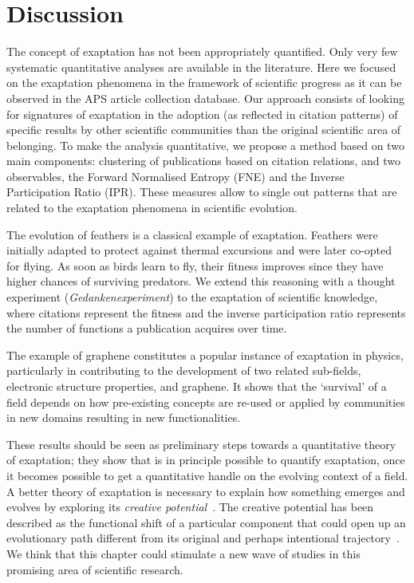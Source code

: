 \documentclass[draft,final]{vutinfth} %
\begin{document}
\section{Discussion}
The concept of exaptation has not been appropriately quantified. 
Only very few systematic quantitative analyses are available in the literature. 
Here we focused on the exaptation phenomena in the framework of scientific progress as it can be observed in the APS article collection database. 
Our approach consists of looking for signatures of exaptation in the adoption (as reflected in citation patterns) of specific results by other scientific communities than the original scientific area of belonging. 
To make the analysis quantitative, we propose a method based on two main components: clustering of publications based on citation relations, and two observables, the Forward Normalised Entropy (FNE) and the Inverse Participation Ratio (IPR). 
These measures allow to single out patterns that are related to the exaptation phenomena in scientific evolution. 

The evolution of feathers is a classical example of exaptation. 
Feathers were initially adapted to protect against thermal excursions and were later co-opted for flying. 
As soon as birds learn to fly, their fitness improves since they have higher chances of surviving predators. 
We extend this reasoning with a thought experiment ({\em Gedankenexperiment}) to the exaptation of scientific knowledge, where citations represent the fitness and the inverse participation ratio represents the number of  functions a publication acquires over time.

The  example of graphene constitutes a popular instance of exaptation in physics, particularly in contributing to the development of two related sub-fields, electronic structure properties, and graphene. 
It shows that the `survival' of a field depends on how pre-existing concepts are re-used or applied by communities in new domains resulting in new functionalities. 

These results should be seen as preliminary steps towards a quantitative theory of exaptation; they show that is in principle possible to quantify exaptation, once it becomes possible to get a quantitative handle on the evolving context of a field. A better theory of exaptation is necessary to explain how something emerges and evolves by exploring its \emph{creative potential}~\cite{andriani2016exaptation}. 
The creative potential has been described as the functional shift of a particular component that could open up an evolutionary path different from its original and perhaps intentional trajectory~\cite{andriani2016exaptation,kauffman1993origins}. We think that this chapter could stimulate a new wave of studies in this promising area of scientific research. 
\end{document}
